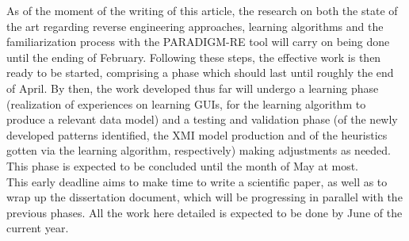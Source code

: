 As of the moment of the writing of this article, the research on both the state of the art regarding reverse engineering approaches, learning algorithms and the familiarization process with the PARADIGM-RE tool will carry on being done until the ending of February. Following these steps, the effective work is then ready to be started, comprising a phase which should last until roughly the end of April. By then, the work developed thus far will undergo a learning phase (realization of experiences on learning GUIs, for the learning algorithm to produce a relevant data model) and a testing and validation phase (of the newly developed patterns identified, the XMI model production and of the heuristics gotten via the learning algorithm, respectively) making adjustments as needed. This phase is expected to be concluded until the month of May at most. \\
This early deadline aims to make time to write a scientific paper, as well as to wrap up the dissertation document, which will be progressing in parallel with the previous phases. All the work here detailed is expected to be done by June of the current year.